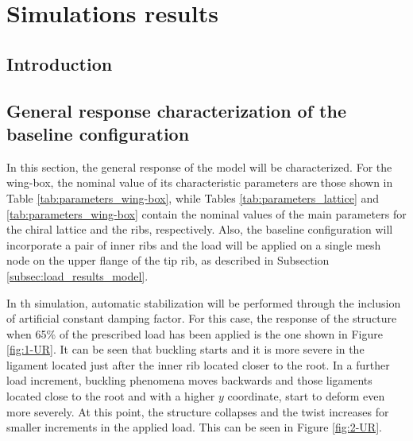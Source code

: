 \chapter{Simulations results} \label{chap:results_sim}

\section{Introduction} \label{sec:intro_results_sim}


\section{General response characterization of the baseline configuration} \label{sec:generalResponseCharact_results_sim}

  In this section, the general response of the model will be characterized. For the wing-box, the nominal value of its characteristic parameters are those shown in Table \ref{tab:parameters_wing-box}, while Tables \ref{tab:parameters_lattice} and \ref{tab:parameters_wing-box} contain the nominal values of the main parameters for the chiral lattice and the ribs, respectively. Also, the baseline configuration will incorporate a pair of inner ribs and the load will be applied on a single mesh node on the upper flange of the tip rib, as described in Subsection \ref{subsec:load_results_model}.

  In th simulation, automatic stabilization will be performed through the inclusion of artificial constant damping factor. For this case, the response of the structure when 65\% of the prescribed load has been applied is the one shown in Figure \ref{fig:1-UR}. It can be seen that buckling starts and it is more severe in the ligament located just after the inner rib located closer to the root. In a further load increment, buckling phenomena moves backwards and those ligaments located close to the root and with a higher $y$ coordinate, start to deform even more severely. At this point, the structure collapses and the twist increases for smaller increments in the applied load. This can be seen in Figure \ref{fig:2-UR}.

